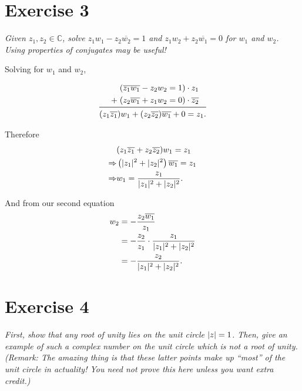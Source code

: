 \documentclass{tufte-handout}
\DeclarePairedDelimiter\abs{\lvert}{\rvert}%
\begin{document}
\section{Exercise 3}

\textit{Given $z_1, z_2 \in \mathbb{C}$, solve
  $z_1 w_1 - z_2 \overline{w_2} = 1$ and
  $z_1 w_2 + z_2 \overline{w_1} = 0$ for $w_1$ and $w_2$. Using
  properties of conjugates may be useful!}

Solving for $w_1$ and $w_2$,

\begin{equation*}
\begin{aligned}
  (\overline{z_1}\overline{w_1} - z_2 w_2 = 1) &\cdot z_1\\
  + \; (z_2 \overline{w_1} + z_1 w_2 = 0) &\cdot \overline{z_2}\\
  \midrule
  (z_1 \overline{z_1})w_1 + (z_2 \overline{z_2})\overline{w_1} + 0 &= z_1.
\end{aligned}
\end{equation*}

Therefore
\begin{align*}
  &(z_1 \overline{z_1} + z_2 \overline{z_2})w_1 = z_1\\
  \Rightarrow &\left( \abs{z_1}^2 + \abs{z_2}^2 \right)\overline{w_1}
                                               = z_1\\
  \Rightarrow &w_1 = {z_1 \over \abs{z_1}^2 + \abs{z_2}^2}.
\end{align*}

And from our second equation
\begin{align*}
  w_2 &= -{z_2 \overline{w_1} \over z_1}\\
      &= -{z_2 \over z_1} \cdot {z_1 \over \abs{z_1}^2 + \abs{z_2}^2}\\
      &= -{z_2 \over \abs{z_1}^2 + \abs{z_2}^2}.
\end{align*}

\section{Exercise 4}

\textit{First, show that any root of unity lies on the unit circle
  $\abs{z} = 1$. Then, give an example of such a complex number on the
  unit circle which is not a root of unity. (Remark: The amazing thing
  is that these latter points make up ``most'' of the unit circle in
  actuality! You need not prove this here unless you want extra
  credit.)}
\end{document}
